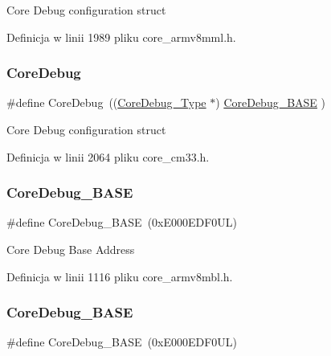 Core Debug configuration struct 

Definicja w linii 1989 pliku core\+\_\+armv8mml.\+h.

\mbox{\label{group___c_m_s_i_s__core__base_gab6e30a2b802d9021619dbb0be7f5d63d}} 
\subsubsection{\texorpdfstring{Core\+Debug}{CoreDebug}\hspace{0.1cm}{\footnotesize\ttfamily [8/8]}}
{\footnotesize\ttfamily \#define Core\+Debug~((\hyperlink{struct_core_debug___type}{Core\+Debug\+\_\+\+Type} $\ast$)     \hyperlink{group___c_m_s_i_s__core__base_ga680604dbcda9e9b31a1639fcffe5230b}{Core\+Debug\+\_\+\+B\+A\+SE}   )}

Core Debug configuration struct 

Definicja w linii 2064 pliku core\+\_\+cm33.\+h.

\mbox{\label{group___c_m_s_i_s__core__base_ga680604dbcda9e9b31a1639fcffe5230b}} 
\subsubsection{\texorpdfstring{Core\+Debug\+\_\+\+B\+A\+SE}{CoreDebug\_BASE}\hspace{0.1cm}{\footnotesize\ttfamily [1/8]}}
{\footnotesize\ttfamily \#define Core\+Debug\+\_\+\+B\+A\+SE~(0x\+E000\+E\+D\+F0\+U\+L)}

Core Debug Base Address 

Definicja w linii 1116 pliku core\+\_\+armv8mbl.\+h.

\mbox{\label{group___c_m_s_i_s__core__base_ga680604dbcda9e9b31a1639fcffe5230b}} 
\subsubsection{\texorpdfstring{Core\+Debug\+\_\+\+B\+A\+SE}{CoreDebug\_BASE}\hspace{0.1cm}{\footnotesize\ttfamily [2/8]}}
{\footnotesize\ttfamily \#define Core\+Debug\+\_\+\+B\+A\+SE~(0x\+E000\+E\+D\+F0\+U\+L)}

